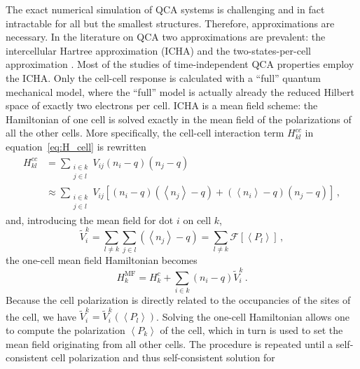 The exact numerical simulation of QCA systems is challenging and in fact
intractable for all but the smallest structures. Therefore, approximations are
necessary. In the literature on QCA two approximations are prevalent: the
intercellular Hartree approximation (ICHA) and the two-states-per-cell
approximation \cite{lent1993quantum} \cite{tougaw1996dynamic}. Most of the
studies of time-independent QCA properties employ the ICHA. Only the cell-cell
response is calculated with a ``full'' quantum mechanical model, where the
``full'' model is actually already the reduced Hilbert space of exactly two
electrons per cell. ICHA is a mean field scheme: the Hamiltonian of one cell is
solved exactly in the mean field of the polarizations of all the other cells.
More specifically, the cell-cell interaction term $H^{cc}_{kl}$ in
equation~\eqref{eq:H_cell} is rewritten
\begin{equation}
\begin{split}
  \label{eq:H_kl_meanfield}
  H^{cc}_{kl} 
  &=
  \sum_{\substack{i \in k\\j \in l}} V_{ij} \left( n_i - q \right) \left( n_j - q \right) \\
  &\approx
  \sum_{\substack{i \in k\\j \in l}} V_{ij} 
       \left[ \left( n_i - q \right) \left( \left< n_j \right> - q \right)
              +
              \left( \left< n_i \right> - q \right) \left( n_j - q \right)
       \right] \, ,
\end{split}
\end{equation}
and, introducing the mean field for dot $i$ on cell $k$,
\begin{equation}
  \label{eq:V_meanfield}
  \tilde{V}_i^k
  = \sum_{l \ne k} \sum_{j \in l} \left( \left< n_j \right> - q \right)
  = \sum_{l \ne k} \mathcal{F} \left[ \left< P_l \right> \right] \, ,
\end{equation}
the one-cell mean field Hamiltonian becomes
\begin{equation}
  \label{eq:H_meanfield}
  H^{\mathrm{MF}}_k
  = H^c_k + \sum_{i \in k} \left( n_i - q \right) \tilde{V}_i^k \, .
\end{equation}
Because the cell polarization is directly related to the occupancies of the
sites of the cell, we have $\tilde{V}_i^k = \tilde{V}_i^k(\left<P_l\right>)$.
Solving the one-cell Hamiltonian allows one to compute the polarization $\left<
P_k \right>$ of the cell, which in turn is used to set the mean field
originating from all other cells. The procedure is repeated until a
self-consistent cell polarization and thus self-consistent solution for
